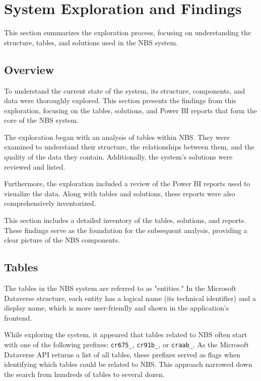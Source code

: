 \section{System Exploration and Findings}

This section summarizes the exploration process, focusing on understanding the structure, tables, and solutions used in the NBS system.

\subsection{Overview}

To understand the current state of the system, its structure, components, and data were thoroughly explored. This section presents the findings from this exploration, focusing on the tables, solutions, and Power BI reports that form the core of the NBS system.

The exploration began with an analysis of tables within NBS. They were examined to understand their structure, the relationships between them, and the quality of the data they contain. Additionally, the system's solutions were reviewed and listed.

Furthermore, the exploration included a review of the Power BI reports used to visualize the data. Along with tables and solutions, these reports were also comprehensively inventorized.

This section includes a detailed inventory of the tables, solutions, and reports. These findings serve as the foundation for the subsequent analysis, providing a clear picture of the NBS components.

\subsection{Tables}

The tables in the NBS system are referred to as "entities." In the Microsoft Dataverse structure, each entity has a logical name (its technical identifier) and a display name, which is more user-friendly and shown in the application's frontend.

While exploring the system, it appeared that tables related to NBS often start with one of the following prefixes: \texttt{cr675\_}, \texttt{cr91b\_}, or \texttt{craab\_}. As the Microsoft Dataverse API returns a list of all tables, these prefixes served as flags when identifying which tables could be related to NBS. This approach narrowed down the search from hundreds of tables to several dozen.

